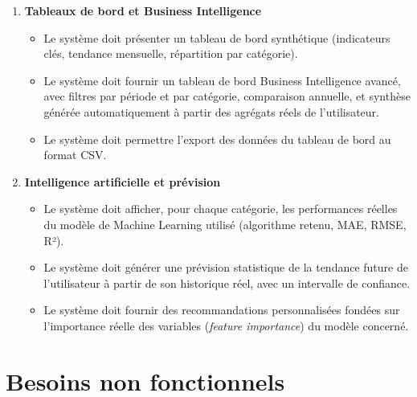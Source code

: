 \begin{enumerate}
\begin{itemize}
    \end{itemize}
    \item \textbf{Tableaux de bord et Business Intelligence}
    \begin{itemize}
        \item[BF13.] Le système doit présenter un tableau de bord synthétique (indicateurs clés, tendance mensuelle, répartition par catégorie).
        \item[BF14.] Le système doit fournir un tableau de bord Business Intelligence avancé, avec filtres par période et par catégorie, comparaison annuelle, et synthèse générée automatiquement à partir des agrégats réels de l'utilisateur.
        \item[BF15.] Le système doit permettre l'export des données du tableau de bord au format CSV.
    \end{itemize}
    \item \textbf{Intelligence artificielle et prévision}
    \begin{itemize}
        \item[BF16.] Le système doit afficher, pour chaque catégorie, les performances réelles du modèle de Machine Learning utilisé (algorithme retenu, MAE, RMSE, R²).
        \item[BF17.] Le système doit générer une prévision statistique de la tendance future de l'utilisateur à partir de son historique réel, avec un intervalle de confiance.
        \item[BF18.] Le système doit fournir des recommandations personnalisées fondées sur l'importance réelle des variables (\textit{feature importance}) du modèle concerné.
    \end{itemize}
\end{enumerate}

\section{Besoins non fonctionnels}

